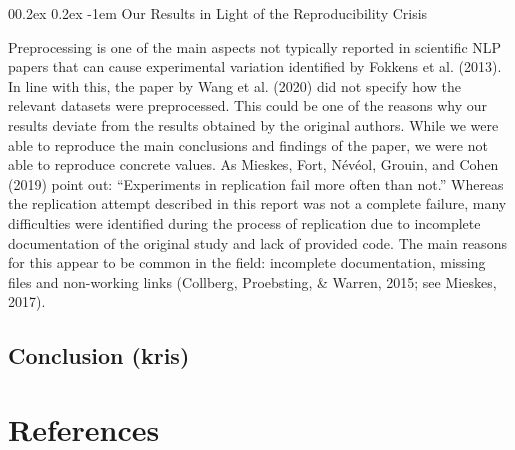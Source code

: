 \documentclass[
  english,
  man,floatsintext]{apa6}
\makeatletter
\let\oldparagraph\paragraph
\renewcommand{\paragraph}[1]{\oldparagraph{#1}\mbox{}}
\renewcommand{\paragraph}{\@startsection{paragraph}{4}{\parindent}%
  {0\baselineskip \@plus 0.2ex \@minus 0.2ex}%
  {-1em}%
  {\normalfont\normalsize\bfseries\itshape\typesectitle}}
\makeatother
\begin{document}
\hypertarget{our-results-in-light-of-the-reproducibility-crisis}{%
\paragraph{Our Results in Light of the Reproducibility Crisis}\label{our-results-in-light-of-the-reproducibility-crisis}}

Preprocessing is one of the main aspects not typically reported in scientific NLP papers that can cause experimental variation identified by Fokkens et al. (2013). In line with this, the paper by Wang et al. (2020) did not specify how the relevant datasets were preprocessed. This could be one of the reasons why our results deviate from the results obtained by the original authors. While we were able to reproduce the main conclusions and findings of the paper, we were not able to reproduce concrete values. As Mieskes, Fort, Névéol, Grouin, and Cohen (2019) point out: ``Experiments in replication fail more often than not.'' Whereas the replication attempt described in this report was not a complete failure, many difficulties were identified during the process of replication due to incomplete documentation of the original study and lack of provided code. The main reasons for this appear to be common in the field: incomplete documentation, missing files and non-working links (Collberg, Proebsting, \& Warren, 2015; see Mieskes, 2017).

\hypertarget{conclusion-kris}{%
\subsection{Conclusion (kris)}\label{conclusion-kris}}

\newpage

\hypertarget{references}{%
\section{References}\label{references}}

\begingroup
\setlength{\parindent}{-0.5in}
\setlength{\leftskip}{0.5in}
\end{document}
